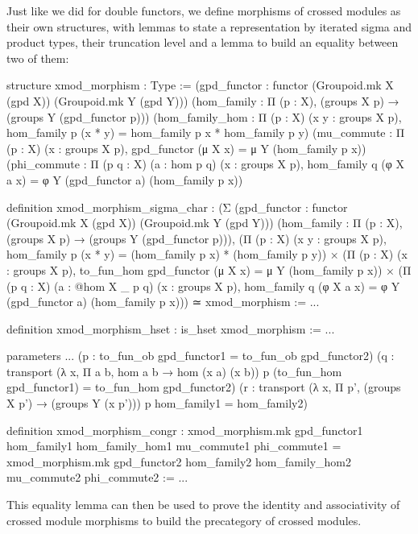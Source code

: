 Just like we did for double functors, we define morphisms of crossed modules as
their own structures, with lemmas to state a representation by iterated sigma
and product types, their truncation level and a lemma to build an equality between
two of them:
\begin{leancodebr}
  structure xmod_morphism : Type :=
    (gpd_functor : functor (Groupoid.mk X (gpd X)) (Groupoid.mk Y (gpd Y)))
    (hom_family : Π (p : X), (groups X p) → (groups Y (gpd_functor p)))
    (hom_family_hom : Π (p : X) (x y : groups X p),
      hom_family p (x * y) = hom_family p x * hom_family p y)
    (mu_commute : Π (p : X) (x : groups X p), 
      gpd_functor (μ X x) = μ Y (hom_family p x))
    (phi_commute : Π (p q : X) (a : hom p q) (x : groups X p),
      hom_family q (φ X a x) = φ Y (gpd_functor a) (hom_family p x))

  definition xmod_morphism_sigma_char :
    (Σ (gpd_functor : functor (Groupoid.mk X (gpd X)) (Groupoid.mk Y (gpd Y)))
      (hom_family : Π (p : X), (groups X p) → (groups Y (gpd_functor p))),
      (Π (p : X) (x y : groups X p),
        hom_family p (x * y) = (hom_family p x) * (hom_family p y))
      × (Π (p : X) (x : groups X p),
      to_fun_hom gpd_functor (μ X x) = μ Y (hom_family p x))
      × (Π (p q : X) (a : @hom X _ p q) (x : groups X p),
      hom_family q (φ X a x) = φ Y (gpd_functor a) (hom_family p x)))
        ≃ xmod_morphism := ...

  definition xmod_morphism_hset : is_hset xmod_morphism := ...

  parameters ...
    (p : to_fun_ob gpd_functor1 = to_fun_ob gpd_functor2)
    (q : transport (λ x, Π a b, hom a b → hom (x a) (x b)) p
      (to_fun_hom gpd_functor1) = to_fun_hom gpd_functor2)
    (r : transport (λ x, Π p', (groups X p') → (groups Y (x p'))) p 
      hom_family1 = hom_family2)

  definition xmod_morphism_congr :
    xmod_morphism.mk gpd_functor1 hom_family1 
      hom_family_hom1 mu_commute1 phi_commute1
    = xmod_morphism.mk gpd_functor2 hom_family2
      hom_family_hom2 mu_commute2 phi_commute2 := ...
\end{leancodebr}

This equality lemma can then be used to prove the identity and associativity of
crossed module morphisms to build the precategory of crossed modules.

